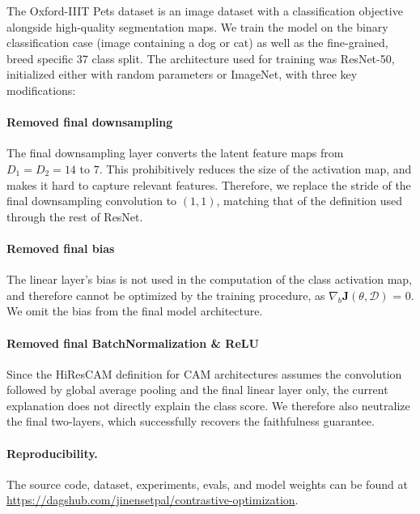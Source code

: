\documentclass{article}
\theoremstyle{plain}
\theoremstyle{definition}
\theoremstyle{remark}
\begin{document}

The Oxford-IIIT Pets dataset is an image dataset with a classification objective alongside high-quality segmentation maps. We train the model on the binary classification case (image containing a dog or cat) as well as the fine-grained, breed specific 37 class split. The architecture used for training was ResNet-50, initialized either with random parameters or ImageNet, with three key modifications:

\paragraph{Removed final downsampling} The final downsampling layer converts the latent feature maps from $D_1 = D_2 = 14$ to $7$. This prohibitively reduces the size of the activation map, and makes it hard to capture relevant features. Therefore, we replace the stride of the final downsampling convolution to $(1,1)$, matching that of the definition used through the rest of ResNet. 

\paragraph{Removed final bias} The linear layer's bias is not used in the computation of the class activation map, and therefore cannot be optimized by the training procedure, as $\nabla_b \mathcal{\bm{J}}(\theta, \mathcal{D})$ = 0. We omit the bias from the final model architecture.

\paragraph{Removed final BatchNormalization \& ReLU} Since the HiResCAM definition for CAM architectures assumes the convolution followed by global average pooling and the final linear layer only, the current explanation does not directly explain the class score. We therefore also neutralize the final two-layers, which successfully recovers the faithfulness guarantee.

\paragraph{Reproducibility.} The source code, dataset, experiments, evals, and model weights can be found at \url{https://dagshub.com/jinensetpal/contrastive-optimization}.
\end{document}
